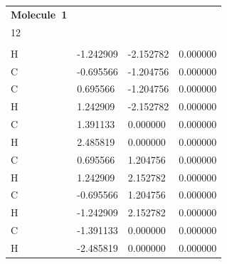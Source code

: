 \documentclass[main_brownies.tex]{subfiles}
\begin{document}
\begin{center}
	\footnotesize
	\begin{tabular}{@{}llll}
		\textbf{Molecule~1} & & & \\		
		12 & & &\\
		 & & & \\
		H & -1.242909 & -2.152782 & 0.000000\\
		C & -0.695566 & -1.204756 & 0.000000\\
		C &  0.695566 & -1.204756 & 0.000000\\
		H &  1.242909 & -2.152782 & 0.000000\\
		C &  1.391133 & 0.000000 & 0.000000\\
		H &  2.485819 & 0.000000 & 0.000000\\
		C &  0.695566 & 1.204756 & 0.000000\\
		H &  1.242909 & 2.152782 & 0.000000\\
		C & -0.695566 & 1.204756 & 0.000000\\
		H & -1.242909 & 2.152782 & 0.000000\\
		C & -1.391133 & 0.000000 & 0.000000\\
		H & -2.485819 & 0.000000 & 0.000000\\
	\end{tabular}
\end{center}

\end{document}
